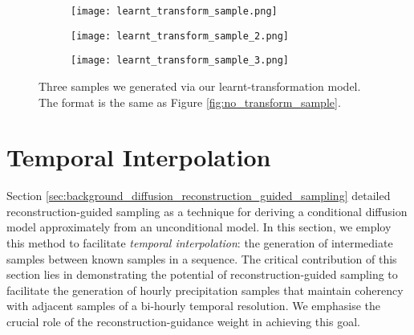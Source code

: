 \documentclass[ oneside,%
                    author={George Herbert},
                    degree={MSci},
                     title={Diffusion Models for Time-Evolving Precipitation Fields},
                  subtitle={}]{dissertation}
\begin{document}
\begin{figure}[htbp]
      \centering
      \begin{subfigure}{\textwidth}
            \texttt{[image: learnt\_transform\_sample.png]}
      \end{subfigure}
      \begin{subfigure}{\textwidth}
            \texttt{[image: learnt\_transform\_sample\_2.png]}
      \end{subfigure}
      \begin{subfigure}{\textwidth}
            \texttt{[image: learnt\_transform\_sample\_3.png]}
      \end{subfigure}
      \caption{Three samples we generated via our learnt-transformation model. The format is the same as Figure \ref{fig:no_transform_sample}.}
      \label{fig:learnt_transform_sample}
\end{figure}


\section{Temporal Interpolation}
\label{sec:results_temporal_interpolation}

Section \ref{sec:background_diffusion_reconstruction_guided_sampling} detailed reconstruction-guided sampling \cite{VDM_Ho} as a technique for deriving a conditional diffusion model approximately from an unconditional model. In this section, we employ this method to facilitate \textit{temporal interpolation}: the generation of intermediate samples between known samples in a sequence. The critical contribution of this section lies in demonstrating the potential of reconstruction-guided sampling to facilitate the generation of hourly precipitation samples that maintain coherency with adjacent samples of a bi-hourly temporal resolution. We emphasise the crucial role of the reconstruction-guidance weight in achieving this goal.
\end{document}
